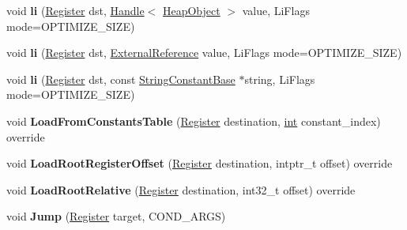 \begin{DoxyCompactItemize}
void {\bfseries li} (\mbox{\hyperlink{classv8_1_1internal_1_1Register}{Register}} dst, \mbox{\hyperlink{classv8_1_1internal_1_1Handle}{Handle}}$<$ \mbox{\hyperlink{classv8_1_1internal_1_1HeapObject}{Heap\+Object}} $>$ value, Li\+Flags mode=O\+P\+T\+I\+M\+I\+Z\+E\+\_\+\+S\+I\+ZE)
\item 
\mbox{\label{classv8_1_1internal_1_1TurboAssembler_aa857485511451fffdc8cf696b9cd1bda}} 
void {\bfseries li} (\mbox{\hyperlink{classv8_1_1internal_1_1Register}{Register}} dst, \mbox{\hyperlink{classv8_1_1internal_1_1ExternalReference}{External\+Reference}} value, Li\+Flags mode=O\+P\+T\+I\+M\+I\+Z\+E\+\_\+\+S\+I\+ZE)
\item 
\mbox{\label{classv8_1_1internal_1_1TurboAssembler_ae93699c059131318d8ff428237278be8}} 
void {\bfseries li} (\mbox{\hyperlink{classv8_1_1internal_1_1Register}{Register}} dst, const \mbox{\hyperlink{classv8_1_1internal_1_1StringConstantBase}{String\+Constant\+Base}} $\ast$string, Li\+Flags mode=O\+P\+T\+I\+M\+I\+Z\+E\+\_\+\+S\+I\+ZE)
\item 
\mbox{\label{classv8_1_1internal_1_1TurboAssembler_a6c8fae865ac1fd7f79f9d4934a46392a}} 
void {\bfseries Load\+From\+Constants\+Table} (\mbox{\hyperlink{classv8_1_1internal_1_1Register}{Register}} destination, \mbox{\hyperlink{classint}{int}} constant\+\_\+index) override
\item 
\mbox{\label{classv8_1_1internal_1_1TurboAssembler_a20588856c39f30350ccd570332e761ea}} 
void {\bfseries Load\+Root\+Register\+Offset} (\mbox{\hyperlink{classv8_1_1internal_1_1Register}{Register}} destination, intptr\+\_\+t offset) override
\item 
\mbox{\label{classv8_1_1internal_1_1TurboAssembler_a77e9d10255bc9a25985ff71df883e665}} 
void {\bfseries Load\+Root\+Relative} (\mbox{\hyperlink{classv8_1_1internal_1_1Register}{Register}} destination, int32\+\_\+t offset) override
\item 
\mbox{\label{classv8_1_1internal_1_1TurboAssembler_a1dc66e1ef4410624353228ff46167ef7}} 
void {\bfseries Jump} (\mbox{\hyperlink{classv8_1_1internal_1_1Register}{Register}} target, C\+O\+N\+D\+\_\+\+A\+R\+GS)

\end{DoxyCompactItemize}
